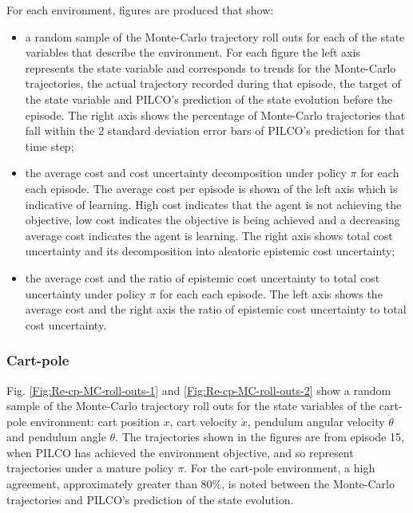 For each environment, figures are produced that show:
\begin{itemize}
    \item a random sample of the Monte-Carlo trajectory roll outs for each of the state variables that describe the environment. For each figure the left axis represents the state variable and corresponds to trends for the Monte-Carlo trajectories, the actual trajectory recorded during that episode, the target of the state variable and PILCO's prediction of the state evolution before the episode. The right axis shows the percentage of Monte-Carlo trajectories that fall within the 2 standard deviation error bars of PILCO's prediction for that time step;
    \item the average cost and cost uncertainty decomposition under policy $\pi$ for each each episode. The average cost per episode is shown of the left axis which is indicative of learning. High cost indicates that the agent is not achieving the objective, low cost indicates the objective is being achieved and a decreasing average cost indicates the agent is learning. The right axis shows total cost uncertainty and its decomposition into aleatoric epistemic cost uncertainty;
    \item the average cost and the ratio of epistemic cost uncertainty to total cost uncertainty under policy $\pi$ for each each episode. The left axis shows the average cost and the right axis the ratio of epistemic cost uncertainty to total cost uncertainty.
\end{itemize}

\subsubsection{Cart-pole}
Fig. \ref{Fig:Re-cp-MC-roll-outs-1} and \ref{Fig:Re-cp-MC-roll-outs-2} show a random sample of the Monte-Carlo trajectory roll outs for the state variables of the cart-pole environment: cart position $x$, cart velocity $\dot{x}$, pendulum angular velocity $\dot \theta$ and pendulum angle $\theta$. The trajectories shown in the figures are from episode 15, when PILCO has achieved the environment objective, and so represent trajectories under a mature policy $\pi$.  For the cart-pole environment, a high agreement, approximately greater than $80\%$, is noted between the Monte-Carlo trajectories and PILCO's prediction of the state evolution.

